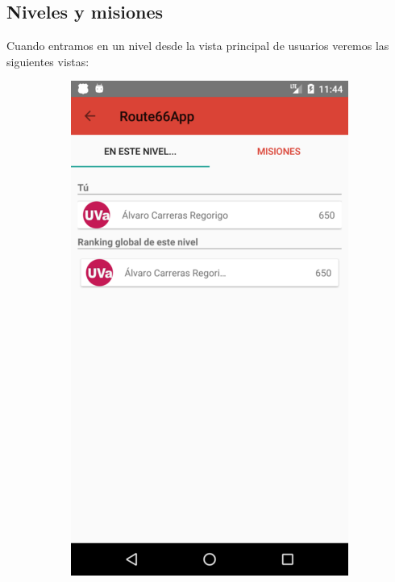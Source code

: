 \documentclass[twoside]{report}
\begin{document}
\subsection{Niveles y misiones}
Cuando entramos en un nivel desde la vista principal de usuarios veremos las siguientes vistas:
\begin{figure}[H]
\begin{center}
	\begin{subfigure}[t]{.3\linewidth}
		\includegraphics[scale=0.2]{images/userguide/23.png}

\end{subfigure}
\end{center}
\end{figure}
\end{document}
